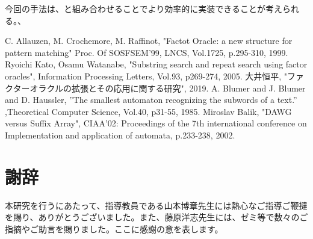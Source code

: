 \documentclass[11pt,a4paper]{jreport}
\begin{document}
  今回の手法は、\cite{dawg-bit}と組み合わせることでより効率的に実装できることが考えられる。、



  \begin{thebibliography}{10}
     C. Allauzen, M. Crochemore, M. Raffinot, "Factot Oracle: a new structure for pattern matching" Proc. Of SOSFSEM'99, LNCS, Vol.1725, p.295-310, 1999.
     Ryoichi Kato, Osamu Watanabe, "Substring search and repeat search using factor oracles", Information Processing Letters, Vol.93, p269-274, 2005.
     大井恒平, "ファクターオラクルの拡張とその応用に関する研究", 2019.
     A. Blumer and J. Blumer and D. Haussler, ”The smallest automaton recognizing the subwords of a text.” ,Theoretical Computer Science, Vol.40, p31-55, 1985.
     Miroslav Balik, "DAWG versus Suffix Array", CIAA'02: Proceedings of the 7th international conference on Implementation and application of automata, p.233-238, 2002.
  \end{thebibliography}

  \section*{謝辞}
本研究を行うにあたって、指導教員である山本博章先生には熱心なご指導ご鞭撻を賜り、ありがとうございました。また、藤原洋志先生には、ゼミ等で数々のご指摘やご助言を賜りました。ここに感謝の意を表します。
\end{document}
